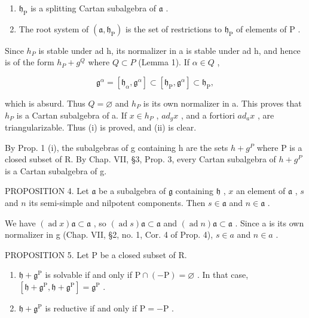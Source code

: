 \begin{enumerate}
\def\labelenumi{(\roman{enumi})}
\item
  \(\mathfrak{h}_{\mathrm{P}}\) is a splitting Cartan subalgebra of \(\mathfrak{a}\) .
\item
  The root system of \((\mathfrak{a},\mathfrak{h}_{\mathrm{P}})\) is the set of restrictions to \(\mathfrak{h}_{\mathrm{P}}\) of elements of \(\mathrm{P}\) .
\end{enumerate}

Since \(h_{P}\) is stable under ad h, its normalizer in a is stable under ad h, and hence is of the form \(h_{P} + g^{Q}\) where \(Q \subset P\) (Lemma 1). If \(\alpha \in Q\) ,

\[
\mathfrak {g} ^ {\alpha} = \left[ \mathfrak {h} _ {\alpha}, \mathfrak {g} ^ {\alpha} \right] \subset \left[ \mathfrak {h} _ {\mathrm{P}}, \mathfrak {g} ^ {\alpha} \right] \subset \mathfrak {h} _ {\mathrm{P}},
\]

which is absurd. Thus \(Q = \varnothing\) and \(h_{P}\) is its own normalizer in a. This proves that \(h_{P}\) is a Cartan subalgebra of a. If \(x \in h_{P}\) , \(ad_{g}x\) , and a fortiori \(ad_{a}x\) , are triangularizable. Thus (i) is proved, and (ii) is clear.

By Prop. 1 (i), the subalgebras of g containing h are the sets \(h + g^{P}\) where P is a closed subset of R. By Chap. VII, §3, Prop. 3, every Cartan subalgebra of \(h + g^{P}\) is a Cartan subalgebra of g.

PROPOSITION 4. Let \(\mathfrak{a}\) be a subalgebra of \(\mathfrak{g}\) containing \(\mathfrak{h}\) , \(x\) an element of \(\mathfrak{a}\) , \(s\) and \(n\) its semi-simple and nilpotent components. Then \(s \in \mathfrak{a}\) and \(n \in \mathfrak{a}\) .

We have \((\operatorname{ad} x)\mathfrak{a} \subset \mathfrak{a}\) , so \((\operatorname{ad} s)\mathfrak{a} \subset \mathfrak{a}\) and \((\operatorname{ad} n)\mathfrak{a} \subset \mathfrak{a}\) . Since a is its own normalizer in g (Chap. VII, §2, no. 1, Cor. 4 of Prop. 4), \(s \in a\) and \(n \in a\) .

PROPOSITION 5. Let P be a closed subset of R.

\begin{enumerate}
\def\labelenumi{(\roman{enumi})}
\item
  \(\mathfrak{h} + \mathfrak{g}^{\mathrm{P}}\) is solvable if and only if \(\mathrm{P} \cap (-\mathrm{P}) = \varnothing\) . In that case, \([\mathfrak{h} + \mathfrak{g}^{\mathrm{P}}, \mathfrak{h} + \mathfrak{g}^{\mathrm{P}}] = \mathfrak{g}^{\mathrm{P}}\) .
\item
  \(\mathfrak{h} + \mathfrak{g}^{\mathrm{P}}\) is reductive if and only if \(\mathrm{P} = -\mathrm{P}\) .
\end{enumerate}

